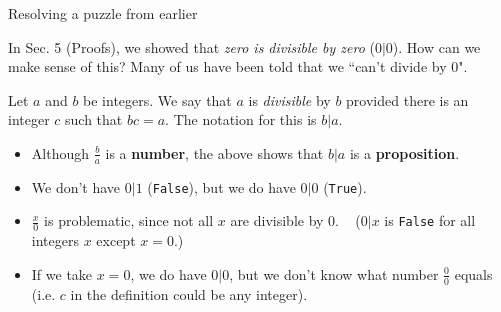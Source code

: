 \documentclass[10pt]{beamer}
\begin{document}
\begin{frame}{Resolving a puzzle from earlier}
\footnotesize 
\begin{myyellowbox}[title=Puzzle]
In Sec. 5 (Proofs), we showed that  \textit{zero is divisible by zero} ($0|0$). How can we make sense of this? Many of us have been told that we ``can't divide by 0". \end{myyellowbox}
\pause 
\vfill 
	\begin{mydef}[title=Reminder of Definition 3.2 (\textbf{Divisible})]
	Let $a$ and $b$ be integers.  We say that $a$ is \textit{divisible} by $b$ provided there is an integer $c$ such that $bc=a$. The notation for this is $b|a$. 
	\end{mydef}
\vfill 
\begin{myredbox}[title=Observations]   
\begin{itemize}
\item  Although $\frac{b}{a}$ is a \textbf{number},  the above shows that $b|a$ is a \textbf{proposition}. 
\item 	We don’t have $0|1$ (\texttt{False}), but we do have $0|0$ (\texttt{True}).   
\end{itemize}
\end{myredbox}

\begin{myyellowbox}[title=Resolution to Puzzle]
\begin{itemize}
\item $\frac{x}{0}$ is problematic, since not all $x$ are divisible by 0.   ($0|x$ is \texttt{False} for all integers $x$ except $x=0$.)
\item If we take $x=0$, we do have $0|0$, but we don't know what number  $\frac{0}{0}$ equals (i.e. $c$ in the definition could be any integer).  %
\end{itemize}

\end{myyellowbox}


\end{frame}
\end{document}
